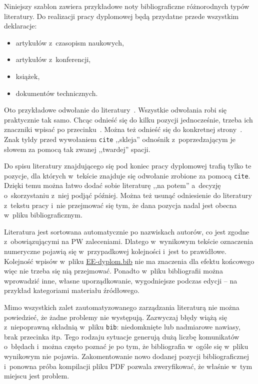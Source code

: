 Niniejszy szablon zawiera przykładowe noty bibliograficzne różnorodnych typów literatury. Do realizacji pracy dyplomowej będą przydatne przede wszystkim deklaracje:
\begin{itemize}
    \item artykułów z~czasopism naukowych,
    \item artykułów z~konferencji,
    \item książek,
    \item dokumentów technicznych.
\end{itemize}

Oto przykładowe odwołanie do literatury~\cite{fowler2009}. Wszystkie odwołania robi się praktycznie tak samo. Chcąc odnieść się do kilku pozycji jednocześnie, trzeba ich znaczniki wpisać po przecinku~\cite{maxwell1865,leksinski1995}. Można też odnieść się do konkretnej strony~\cite[s.~38]{leksinski1995}. Znak tyldy przed wywołaniem \texttt{cite} ,,skleja'' odnośnik z~poprzedzającym je słowem za pomocą tak zwanej ,,twardej'' spacji.

Do spisu literatury znajdującego się pod koniec pracy dyplomowej trafią tylko te pozycje, dla których w~tekście znajduje się odwołanie zrobione za pomocą \texttt{cite}. Dzięki temu można łatwo dodać sobie literaturę ,,na potem'' a~decyzję o~skorzystaniu z~niej podjąć później. Można też usunąć odniesienie do literatury z~tekstu pracy i~nie przejmować się tym, że dana pozycja nadal jest obecna w~pliku bibliograficznym.

Literatura jest sortowana automatycznie po nazwiskach autorów, co jest zgodne z~obowiązującymi na PW zaleceniami. Dlatego w~wynikowym tekście oznaczenia numeryczne pojawią się w~przypadkowej kolejności i~jest to prawidłowe. Kolejność wpisów w~pliku \href{./EE-dyplom.bib}{EE-dyplom.bib} nie ma znaczenia dla efektu końcowego więc nie trzeba się nią przejmować. Ponadto w~pliku bibliografii można wprowadzić inne, własne uporządkowanie, wygodniejsze podczas edycji -- na przykład kategoriami materiału źródłowego.

Mimo wszystkich zalet zautomatyzowanego zarządzania literaturą nie można powiedzieć, że żadne problemy nie występują. Zazwyczaj błędy wiążą się z~niepoprawną składnią w~pliku \texttt{bib}: niedomknięte lub nadmiarowe nawiasy, brak przecinka itp. Tego rodzaju sytuacje generują dużą liczbę komunikatów o~błędach i~można często poznać je po tym, że bibliografia w~ogóle się w~pliku wynikowym nie pojawia. Zakomentowanie nowo dodanej pozycji bibliograficznej i~ponowna próba kompilacji pliku PDF pozwala zweryfikować, że właśnie w~tym miejscu jest problem.

